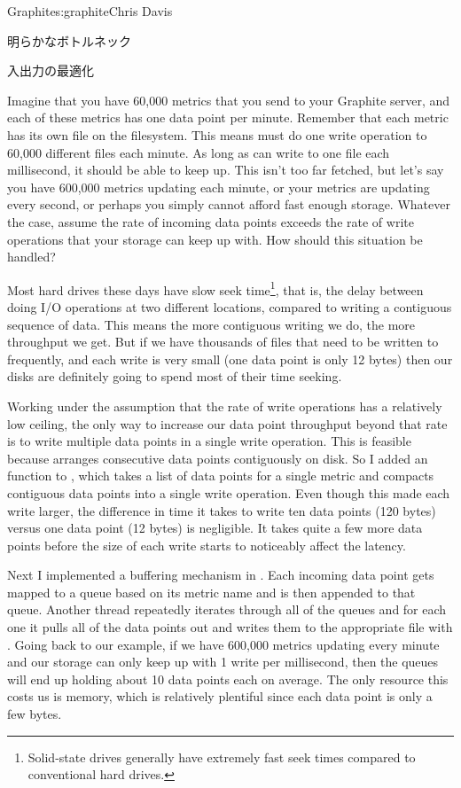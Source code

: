 \begin{aosachapter}{Graphite}{s:graphite}{Chris Davis}
\begin{aosasect1}{明らかなボトルネック}
\end{aosasect1}

\begin{aosasect1}{入出力の最適化}

Imagine that you have 60,000 metrics that you send to your Graphite
server, and each of these metrics has one data point per
minute. Remember that each metric has its own  file on the
filesystem. This means  must do one write operation to 60,000
different files each minute.  As long as  can write to one file
each millisecond, it should be able to keep up. This isn't too far
fetched, but let's say you have 600,000 metrics updating each minute,
or your metrics are updating every second, or perhaps you simply
cannot afford fast enough storage. Whatever the case, assume the rate
of incoming data points exceeds the rate of write operations that your
storage can keep up with. How should this situation be handled?

Most hard drives these days have slow seek time\footnote{Solid-state
drives generally have extremely fast seek times compared to
conventional hard drives.}, that is, the delay between doing I/O
operations at two different locations, compared to writing a
contiguous sequence of data. This means the more contiguous writing we
do, the more throughput we get. But if we have thousands of files that
need to be written to frequently, and each write is very small (one
 data point is only 12 bytes) then our disks are definitely
going to spend most of their time seeking.

Working under the assumption that the rate of write operations has a
relatively low ceiling, the only way to increase our data point
throughput beyond that rate is to write multiple data points in a
single write operation. This is feasible because  arranges
consecutive data points contiguously on disk. So I added an
 function to , which takes a list of data
points for a single metric and compacts contiguous data points into a
single write operation.  Even though this made each write larger, the
difference in time it takes to write ten data points (120 bytes)
versus one data point (12 bytes) is negligible. It takes quite a few
more data points before the size of each write starts to noticeably
affect the latency.

Next I implemented a buffering mechanism in . Each incoming data
point gets mapped to a queue based on its metric name and is then
appended to that queue.  Another thread repeatedly iterates through
all of the queues and for each one it pulls all of the data points out
and writes them to the appropriate  file with
. Going back to our example, if we have 600,000
metrics updating every minute and our storage can only keep up with 1
write per millisecond, then the queues will end up holding about 10
data points each on average. The only resource this costs us is
memory, which is relatively plentiful since each data point is only a
few bytes.


\end{aosasect1}
\end{aosachapter}
